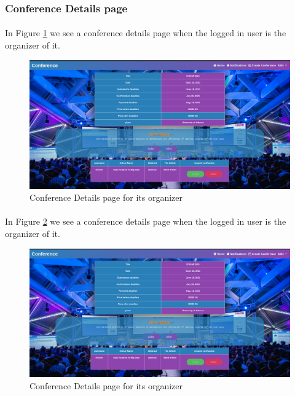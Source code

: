 \documentclass[12pt,a4paper]{article}
\begin{document}
	\subsubsection{Conference Details page}
	\paragraph{}
	In Figure \ref{fig:details-organizer} we see a conference details page when the logged in user is the organizer of it.
	\begin{figure}[b]
		\centering
		\includegraphics[width=\textwidth]{interfaces/details_organizer.png}
		\caption{Conference Details page for its organizer}
		\label{fig:details-organizer}
	\end{figure}
	\paragraph{}
	In Figure \ref{fig:details-non-organizer} we see a conference details page when the logged in user is the organizer of it.
	\begin{figure}[b]
		\centering
		\includegraphics[width=\textwidth]{interfaces/details_organizer.png}
		\caption{Conference Details page for its organizer}
		\label{fig:details-non-organizer}
	\end{figure}
\end{document}
